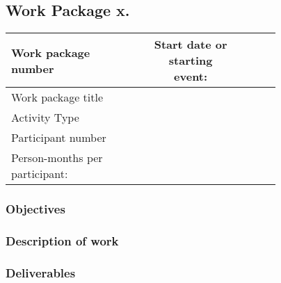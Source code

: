 \subsection{Work Package x.}

\begin{table}[hbpt]\centering
	\begin{tabular}{|p{0.35\linewidth}|p{0.06\linewidth}|p{0.06\linewidth}|p{0.06\linewidth}|
         p{0.06\linewidth}|p{0.06\linewidth}|p{0.06\linewidth}|p{0.06\linewidth}|}\hline
		 Work package number& ~ &
		 \multicolumn{4}{|c|}{Start date or starting event:}{}&
		 \multicolumn{2}{|c|}{                        ~ }{}\\\hline
		 Work package title&\multicolumn{7}{|c|}{      ~ }{}\\\hline
		 Activity Type&\multicolumn{7}{|c|}{           ~ }{}\\\hline
		 Participant number & ~ & ~ & ~ & ~ & ~ & ~ & ~ \\\hline
		 Person-months per participant: & ~ & ~ & ~ & ~ & ~ & ~ & ~ \\\hline
	\end{tabular}
\end{table}

\subsubsection{Objectives}

\subsubsection{Description of work}

\subsubsection{Deliverables}